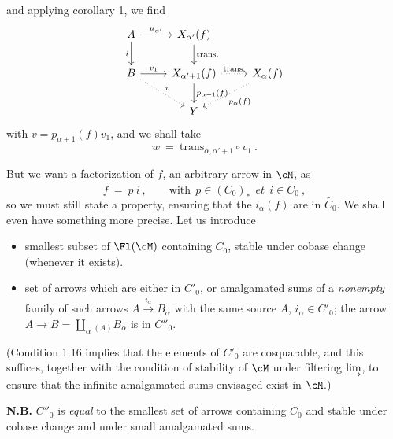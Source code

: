 and applying corollary 1, we find
\[
\begin{tikzcd}
A \arrow[r, "u_{\alpha'}"] \arrow[d, "i"'] & X_{\alpha'}(f) \arrow[d, "\text{trans.}"] & \\
B \arrow[r, "v_1"] \arrow[dr, dotted, "v"] & X_{\alpha'+1}(f) \arrow[r, dotted, "\text{trans.}"] \arrow[d, "p_{\alpha+1}(f)"] & X_\alpha(f) \arrow[dl, dotted, "p_\alpha(f)"] \\ %
 & Y &
\end{tikzcd}
\]
with $v = p_{\alpha+1}(f)v_1$, and we shall take %
\[
w \ = \ \mathrm{trans}_{\alpha,\alpha'+1} \circ v_1 \ .
\]


But we want a factorization of $f$, an arbitrary arrow in $\cM$, as
\[
f \ = \ p\ i \ , \qquad \text{with} \ \ p \in (C_0)_* \ \ \textit{et} \ \ i \in \widetilde{C_0} \ ,
\]
so we must still state a property, ensuring that the $i_\alpha(f)$ are in $\widetilde{C_0}$. We shall even have something more precise. Let us introduce

\begin{itemize}[leftmargin=10em, labelwidth=9em, labelsep=1em, align=left]
\item[(1.18)\hfill $C'_0 \ = $] smallest subset of $\Fl(\cM)$ containing $C_0$, stable under cobase change (whenever it exists).
\item[\hfill $C''_0 \ = $] set of arrows which are either in $C'_0$, or amalgamated sums of a \textit{nonempty} family of such arrows $A \xrightarrow{i_\alpha} B_\alpha$ with the same source $A$, $i_\alpha \in C'_0$; the arrow $A \longrightarrow B = \displaystyle\coprod_{\alpha}{}_{(A)} B_\alpha$ is in $C''_0$.
\end{itemize}

(Condition 1.16 implies that the elements of $C'_0$ are cosquarable, and this suffices, together with the condition of stability of $\cM$ under filtering $\varinjlim$, to ensure that the infinite amalgamated sums envisaged exist in $\cM$.)

\textbf{N.B.} $C''_0$ is \textit{equal} to the smallest set of arrows containing $C_0$ and stable under cobase change and under small amalgamated sums. 

